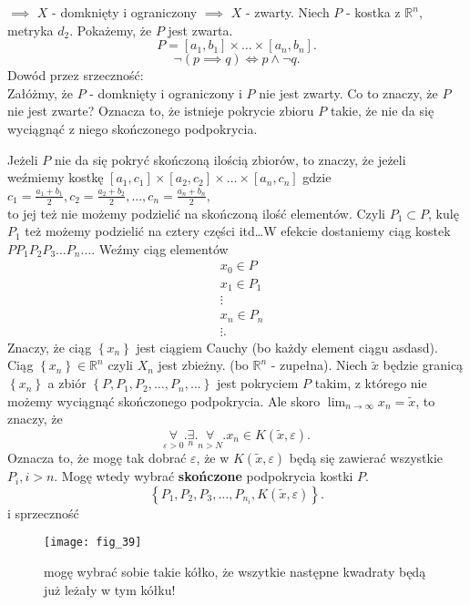 \documentclass[../main.tex]{subfiles}
\begin{document}
\begin{dowod}
    $\implies$ $X$ - domknięty i ograniczony $\implies$ $X$ - zwarty. Niech $P$ - kostka z $\mathbb{R}^n$, metryka $d_2$. Pokażemy, że $P$ jest zwarta.
    \[
        P = [a_1,b_1]\times\ldots\times[a_n,b_n]
    .\]
    \[
        \lnot(p\implies q)\iff p\land \lnot q
    .\]
    Dowód przez srzeczność:\\
    Załóżmy, że $P$ - domknięty i ograniczony i $P$ nie jest zwarty. Co to znaczy, że $P$ nie jest zwarte? Oznacza to, że istnieje pokrycie zbioru $P$ takie, że nie da się wyciągnąć z niego skończonego podpokrycia.

    Jeżeli $P$ nie da się pokryć skończoną ilością zbiorów, to znaczy, że jeżeli weźmiemy kostkę $[a_1,c_1]\times[a_2,c_2]\times\ldots\times[a_n,c_n]$ gdzie $c_1 = \frac{a_1+b_1}{2}, c_2 = \frac{a_2+b_2}{2}, \ldots, c_n = \frac{a_n+b_n}{2}$,\\
    to jej też nie możemy podzielić na skończoną ilość elementów. Czyli $P_1\subset P$, kulę $P_1$ też możemy podzielić na cztery części itd\ldots W efekcie dostaniemy ciąg kostek $P P_1 P_2 P_3 \ldots P_n \ldots$.
    Weźmy ciąg elementów
    \begin{align*}
        &x_0\in P\\
        &x_1\in P_1\\
        &\vdots\\
        &x_n\in P_n\\
        &\vdots
    .\end{align*}
    Znaczy, że ciąg $\left\{ x_n \right\}$ jest ciągiem Cauchy (bo każdy element ciągu asdasd). Ciąg $\left\{ x_n \right\} \in\mathbb{R}^n$ czyli $X_n$ jest zbieżny.
    (bo $\mathbb{R}^n$ - zupełna). Niech $\tilde x$ będzie granicą $\left\{ x_n \right\} $ a zbiór $\left\{ P,P_1,P_2,\ldots,P_n,\ldots \right\} $ jest pokryciem $P$ takim, z którego nie możemy wyciągnąć skończonego podpokrycia. Ale skoro $\lim_{n\to\infty}x_n = \tilde x$, to znaczy, że
    \[
        \underset{\varepsilon>0}{\forall} . \underset{n}{\exists} . \underset{n>N}{\forall} . x_n\in K(\tilde x,\varepsilon)
    .\]
    Oznacza to, że mogę tak dobrać $\varepsilon$, że w $K(\tilde x,\varepsilon)$ będą się zawierać wszystkie $P_{i}, i>n$. Mogę wtedy wybrać \textbf{skończone} podpokrycia kostki $P$.\\
    \[
        \left\{ P_1,P_2,P_3,\ldots,P_{n_i}, K(\tilde x,\varepsilon) \right\}
    .\] i sprzeczność
    \begin{figure}[h]
        \centering
        \texttt{[image: fig\_39]}
        \caption{mogę wybrać sobie takie kółko, że wszytkie następne kwadraty będą już leżały w tym kółku!}
    \end{figure}
    \end{dowod}
\end{document}
